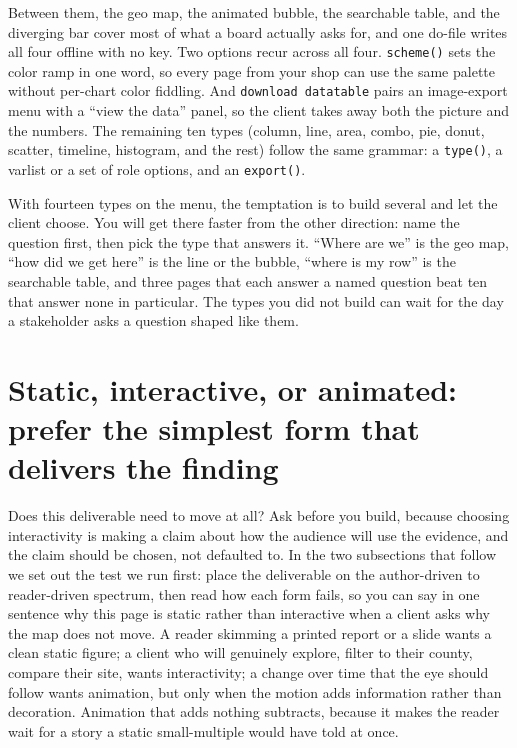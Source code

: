 \documentclass[
    a4paper,
    fontsize=10pt,
    twoside=true,
    numbers=noenddot,
]{kaobook}
\begin{document}
Between them, the geo map, the animated bubble, the searchable table, and the diverging bar cover most of what a board actually asks for, and one do-file writes all four offline with no key. Two options recur across all four. \texttt{scheme()} sets the color ramp in one word, so every page from your shop can use the same palette without per-chart color fiddling. And \texttt{download datatable} pairs an image-export menu with a \enquote{view the data} panel, so the client takes away both the picture and the numbers. The remaining ten types (column, line, area, combo, pie, donut, scatter, timeline, histogram, and the rest) follow the same grammar: a \texttt{type()}, a varlist or a set of role options, and an \texttt{export()}.

With fourteen types on the menu, the temptation is to build several and let the client choose. You will get there faster from the other direction: name the question first, then pick the type that answers it. \enquote{Where are we} is the geo map, \enquote{how did we get here} is the line or the bubble, \enquote{where is my row} is the searchable table, and three pages that each answer a named question beat ten that answer none in particular. The types you did not build can wait for the day a stakeholder asks a question shaped like them.

\section{Static, interactive, or animated: prefer the simplest form that delivers the finding}
Does this deliverable need to move at all? Ask before you build, because choosing interactivity is making a claim about how the audience will use the evidence, and the claim should be chosen, not defaulted to. In the two subsections that follow we set out the test we run first: place the deliverable on the author-driven to reader-driven spectrum, then read how each form fails, so you can say in one sentence why this page is static rather than interactive when a client asks why the map does not move. A reader skimming a printed report or a slide wants a clean static figure; a client who will genuinely explore, filter to their county, compare their site, wants interactivity; a change over time that the eye should follow wants animation, but only when the motion adds information rather than decoration. Animation that adds nothing subtracts, because it makes the reader wait for a story a static small-multiple would have told at once.
\end{document}
